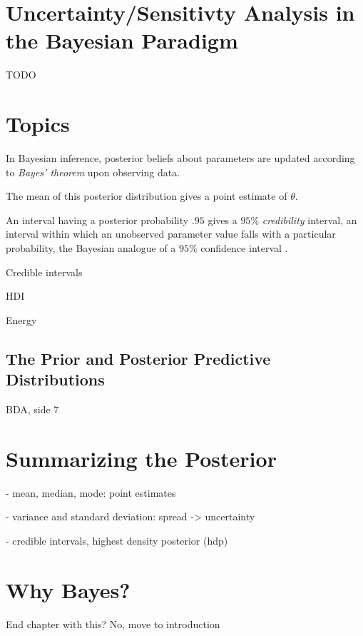 \section{Uncertainty/Sensitivty Analysis in the Bayesian Paradigm}

TODO

\section{Topics} 

In Bayesian inference, posterior beliefs about parameters are updated according to \textit{Bayes' theorem} upon observing data.  

The mean of this posterior distribution gives a point estimate of $\theta$. 

An interval having a posterior probability $.95$ gives a $95\%$ \textit{credibility} interval, an interval within which an unobserved parameter value falls with a particular probability, the Bayesian analogue of a $95\%$ confidence interval \cite[p. 777]{STK}.

Credible intervals 

HDI 

Energy


\subsection{The Prior and Posterior Predictive Distributions}\label{sec:predictive}

BDA, side 7

\section{Summarizing the Posterior}

- mean, median, mode: point estimates

- variance and standard deviation: spread -> uncertainty 

- credible intervals, highest density posterior (hdp) 



\section{Why Bayes?}

End chapter with this? No, move to introduction
